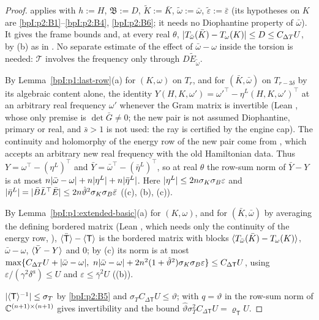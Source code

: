 \begin{proof}
\label{stepI:p2s:tw-t}
 applies with $h:=H$, $\mathfrak B:=D$, $\tilde K:=\bar K$, $\tilde\omega:=\bar\omega$, $\tilde\varepsilon:=\bar\varepsilon$ (its hypotheses on $K$ are
\ref{bpI:p2:B1}--\ref{bpI:p2:B4}, \ref{bpI:p2:B6}; it needs no Diophantine property of $\bar\omega$). It gives the frame bounds and, at every real $\theta$,
$\lvert T_{\bar\omega}(\bar K)-T_\omega(K)\rvert\le D\le C_{\Delta T}U$, by (b) as in . No separate estimate of the effect
of $\bar\omega-\omega$ inside the torsion is needed: $\mathcal T$ involves the frequency only through $D\tilde E_{\tilde\omega}$.

\label{stepI:p2s:tw-y}
By Lemma~\ref{bpI:p1:last-row}(a) for $(K,\omega)$ on $T_r$, and for $(\bar K,\bar\omega)$ on $T_{r-3\delta}$ by its algebraic content
alone, the identity $Y(H,K,\omega')=\omega'^\top-\eta^L(H,K,\omega')^\top$ at an arbitrary real frequency $\omega'$ whenever the Gram
matrix is invertible (Lean , whose only premise is $\det\bar G\ne0$; the
new pair is not assumed Diophantine, primary or real, and $\bar s>1$ is not used: the ray is certified by the engine cap). The
continuity and holomorphy of the energy row of the new pair come from , which accepts an
arbitrary new real frequency with the old Hamiltonian data. Thus
$Y=\omega^\top-(\eta^L)^\top$ and $\bar Y=\bar\omega^\top-(\bar\eta^L)^\top$, so at real $\theta$ the row-sum norm of $\bar Y-Y$ is at most
$n\lvert \bar\omega-\omega\rvert+n\lvert \eta^L\rvert+n\lvert \bar\eta^L\rvert$. Here $\lvert \eta^L\rvert\le2n\sigma_K\sigma_B\varepsilon$ and $\lvert \bar\eta^L\rvert=\lvert \bar B\bar L^\top\bar E\rvert\le
2n\hat\vartheta^2\sigma_K\sigma_B\bar\varepsilon$ ((c), (b), (c)).

\label{stepI:p2s:tw-avg}
By Lemma~\ref{bpI:p1:extended-basic}(a) for $(K,\omega)$, and for $(\bar K,\bar\omega)$ by averaging the defining bordered matrix
(Lean , which needs only the continuity of the energy row,
), $\langle \bar{\mathsf T}\rangle-\langle \mathsf T\rangle$ is the bordered matrix with blocks
$\langle T_{\bar\omega}(\bar K)-T_\omega(K)\rangle$, $\bar\omega-\omega$, $\langle \bar Y-Y\rangle$ and $0$; by (c) its norm is at most
$\max\{C_{\Delta T}U+\abs{\bar\omega-\omega},\ n\abs{\bar\omega-\omega}+2n^2(1+\hat\vartheta^2)\sigma_K\sigma_B\varepsilon\}\le C_{\Delta\mathsf T}U$, using
$\varepsilon/(\gamma^2\delta^a)\le U$ and $\varepsilon\le\bar\gamma^2U$ ((b)).

\label{stepI:p2s:tw-inv}
$\lvert \langle \mathsf T\rangle^{-1}\rvert\le\sigma_T$ by \ref{bpI:p2:B5} and $\sigma_TC_{\Delta\mathsf T}U\le\vartheta$;  with $q=\vartheta$ in the row-sum norm
of $\mathbb{C}^{(n+1)\times(n+1)}$ gives invertibility and the bound $\hat\vartheta\sigma_T^2C_{\Delta\mathsf T}U=\varrho_{\mathsf T}U$.
\end{proof}

